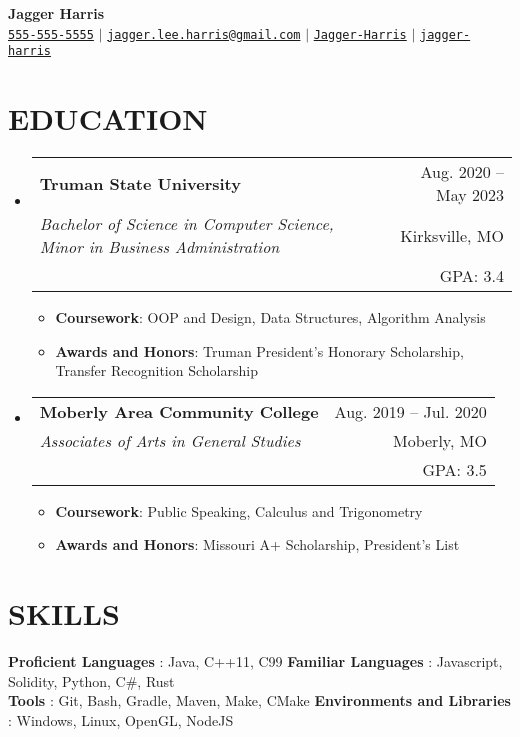 \documentclass[letterpaper,11pt]{article}
\makeatletter
\newcommand{\resumeItem}[1]{
  \item\small{
    {#1 \vspace{-1pt}}
  }
}
\newcommand{\resumeSubheading}[5]{
  \vspace{-1pt}\item
    \begin{tabular*}{\textwidth}[t]{l@{\extracolsep{\fill}}r}
      \textbf{#1} & {\color{dark-grey}\small #2}\vspace{1pt}\\ %
      \textit{#3} & {\color{dark-grey} \small #4}\vspace{1pt}\\ %
      & \color{dark-grey} \small #5
    \end{tabular*}\vspace{-20pt}
}
\newcommand{\resumeSubHeadingListStart}{\begin{itemize}[leftmargin=0in, label={}]}
\newcommand{\resumeSubHeadingListEnd}{\end{itemize}}
\newcommand{\resumeItemListStart}{\begin{itemize}\setlength{\itemindent}{-1em}}
\newcommand{\resumeItemListEnd}{\end{itemize}\vspace{0pt}}
\makeatother
\begin{document}
\begin{center}
	\textbf{\Huge Jagger Harris} \\ \vspace{5pt}
	\small \faPhone* \texttt{\href{tel:+1555-555-5555}{555-555-5555}} \hspace{1pt} $|$
	\hspace{1pt} \faEnvelope \hspace{2pt} \texttt{\href{mailto:jagger.lee.harris@gmail.com}{jagger.lee.harris@gmail.com}} \hspace{1pt} $|$
	\hspace{1pt} \faGithub \hspace{2pt} \texttt{\href{https://github.com/Jagger-Harris}{Jagger-Harris}} \hspace{1pt} $|$
	\hspace{1pt} \faLinkedin \hspace{2pt} \texttt{\href{https://www.linkedin.com/in/jagger-harris/}{jagger-harris}} \hspace{1pt}
	\\ \vspace{-3pt}
\end{center}

\section{EDUCATION}
\resumeSubHeadingListStart

\resumeSubheading
{Truman State University}{Aug. 2020 -- May 2023}
{Bachelor of Science in Computer Science, Minor in Business Administration}{Kirksville, MO}
{GPA: 3.4}
\resumeItemListStart
\resumeItem {\textbf{Coursework}: OOP and Design, Data Structures, Algorithm Analysis}
\resumeItem
{\textbf{Awards and Honors}: Truman President's Honorary Scholarship, Transfer Recognition Scholarship}
\resumeItemListEnd

\resumeSubheading
{Moberly Area Community College}{Aug. 2019 -- Jul. 2020}
{Associates of Arts in General Studies}{Moberly, MO}
{GPA: 3.5}
\resumeItemListStart
\resumeItem {\textbf{Coursework}: Public Speaking, Calculus and Trigonometry}
\resumeItem
{\textbf{Awards and Honors}: Missouri A+ Scholarship, President's List}
\resumeItemListEnd
\resumeSubHeadingListEnd

\section{SKILLS}
\begin{itemize}[leftmargin=0in, label={}]
	\small{\item{
		\textbf{Proficient Languages} {: Java, C++11, C99}\vspace{2pt}
		\hfill
		\textbf{Familiar Languages} {: Javascript, Solidity, Python, C\#, Rust}\vspace{2pt} \\
		\textbf{Tools}     {: Git, Bash, Gradle, Maven, Make, CMake}
    \hfill
    \textbf{Environments and Libraries}     {: Windows, Linux, OpenGL, NodeJS}
	}}
\end{itemize}
\end{document}
